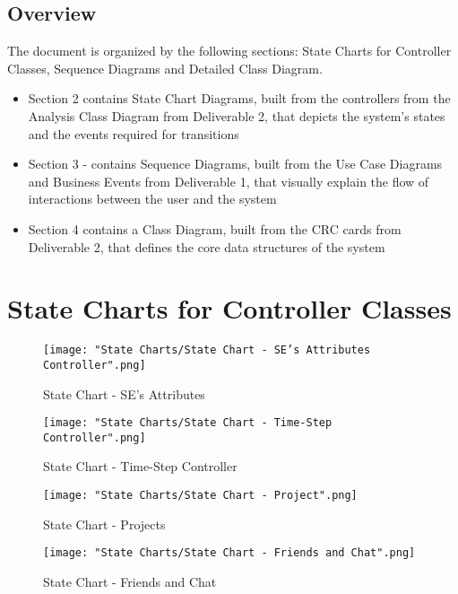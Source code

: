 \documentclass[]{article}
\begin{document}
\subsection{Overview}
\label{sub:overview}
The document is organized by the following sections: State Charts for 
Controller Classes, Sequence Diagrams and Detailed Class Diagram.

\begin{itemize}
    \item[] Section 2 contains State Chart Diagrams, built from the controllers 
    from the Analysis Class Diagram from Deliverable 2, that depicts the 
    system’s states and the events required for transitions

    \item[] Section 3 - contains Sequence Diagrams, built from the Use Case 
    Diagrams and Business Events from Deliverable 1, that visually explain the 
    flow of interactions between the user and the system

    \item[] Section 4 contains a Class Diagram, built from the CRC cards from 
    Deliverable 2, that defines the core data structures of the system
\end{itemize}

\section{State Charts for Controller Classes}
\label{sec:state_charts_for_controller_classes}
\begin{figure}[H]
    \centering
    \texttt{[image: "State Charts/State Chart - SE's Attributes Controller".png]}
    \caption{State Chart - SE’s Attributes}
\end{figure}

\begin{figure}[H]
    \centering
    \texttt{[image: "State Charts/State Chart - Time-Step Controller".png]}
    \caption{State Chart - Time-Step Controller}
\end{figure}

\begin{figure}[H]
    \centering
    \texttt{[image: "State Charts/State Chart - Project".png]}
    \caption{State Chart - Projects}
\end{figure}

\begin{figure}[H]
    \centering
    \texttt{[image: "State Charts/State Chart - Friends and Chat".png]}
    \caption{State Chart - Friends and Chat}
\end{figure}
\end{document}

